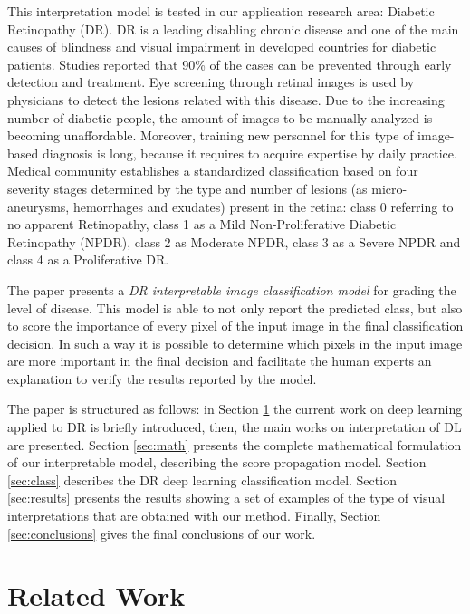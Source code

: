 \documentclass[review]{elsarticle}
\theoremstyle{definition} %
\theoremstyle{remark}
\begin{document}
This interpretation model is tested in our application research area: Diabetic Retinopathy (DR). DR is a leading disabling chronic disease  and  one of the main causes of blindness and visual impairment in developed countries for diabetic patients. Studies reported that 90\% of the cases can be prevented through early detection and treatment. Eye screening through retinal images is used by physicians to detect the lesions related with this disease. Due to the increasing number of diabetic people, the amount of images to be manually analyzed is becoming unaffordable. Moreover, training new personnel for this type of image-based diagnosis is long, because it requires to acquire expertise by daily practice. Medical community establishes a standardized classification based on four severity stages \cite{diaclass} determined by the type and number of lesions (as micro-aneurysms, hemorrhages and exudates) present in the retina: class 0 referring to no apparent Retinopathy, class 1 as a Mild Non-Proliferative Diabetic Retinopathy (NPDR), class 2 as Moderate NPDR, class 3 as a Severe NPDR and class 4 as a Proliferative DR. 

The paper presents a \emph{DR interpretable image classification model} for grading the level of disease. This model is able to not only report the predicted class, but also to score the importance of every pixel of the input image in the final classification decision. In such a way it is possible to determine which pixels in the input image are more important in the final decision and facilitate the human experts an explanation to verify the results reported by the model.

The paper is structured as follows: in Section \ref{sec:related} the current work on deep learning applied to DR is briefly introduced, then, the main works on interpretation of DL are presented. Section \ref{sec:math} presents the complete mathematical formulation of our interpretable model, describing the score propagation model. Section \ref{sec:class} describes the DR deep learning classification model. Section \ref{sec:results} presents the results showing a set of examples of the type of visual interpretations that are obtained with our method. Finally, Section \ref{sec:conclusions} gives the final conclusions of our work.


\section{Related Work}\label{sec:related}
\end{document}
